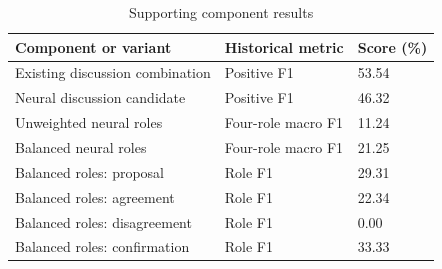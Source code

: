 \documentclass[journal,onecolumn]{IEEEtran}
\begin{document}
\begin{table}[htbp]
\centering\footnotesize
\caption{Supporting component results}
\setlength{\tabcolsep}{3pt}
\renewcommand{\arraystretch}{1.15}
\begin{tabular}{p{}p{}p{}}
\toprule
{\raggedright Component or variant\par} & {\raggedright Historical metric\par} & {\raggedright Score (\%)\par} \\
\midrule
{\raggedright Existing discussion combination\par} & {\raggedright Positive F1\par} & {\raggedright 53.54\par} \\
{\raggedright Neural discussion candidate\par} & {\raggedright Positive F1\par} & {\raggedright 46.32\par} \\
{\raggedright Unweighted neural roles\par} & {\raggedright Four-role macro F1\par} & {\raggedright 11.24\par} \\
{\raggedright Balanced neural roles\par} & {\raggedright Four-role macro F1\par} & {\raggedright 21.25\par} \\
{\raggedright Balanced roles: proposal\par} & {\raggedright Role F1\par} & {\raggedright 29.31\par} \\
{\raggedright Balanced roles: agreement\par} & {\raggedright Role F1\par} & {\raggedright 22.34\par} \\
{\raggedright Balanced roles: disagreement\par} & {\raggedright Role F1\par} & {\raggedright 0.00\par} \\
{\raggedright Balanced roles: confirmation\par} & {\raggedright Role F1\par} & {\raggedright 33.33\par} \\
\bottomrule
\end{tabular}
\end{table}
\end{document}
